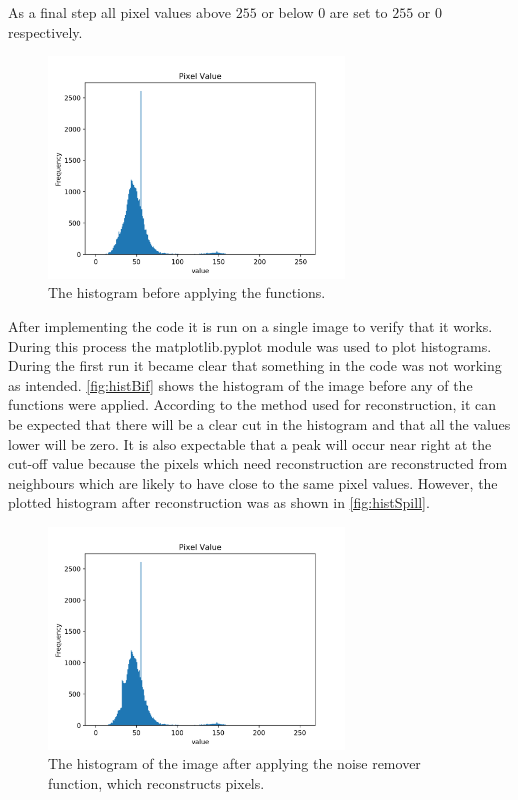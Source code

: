 As a final step all pixel values above $ 255 $ or below $ 0 $ are set to $ 255 $ or $ 0 $ respectively.

\begin{figure}[h]
\centering
\includegraphics[width=0.7\textwidth]{figures/hist_before.png}
\caption{The histogram before applying the functions.}
\label{fig:histBif}
\end{figure}

\noindent
After implementing the code it is run on a single image to verify that it works. During this process the matplotlib.pyplot module was used to plot histograms. During the first run it became clear that something in the code was not working as intended. \autoref{fig:histBif} shows the histogram of the image before any of the functions were applied. According to the method used for reconstruction, it can be expected that there will be a clear cut in the histogram and that all the values lower will be zero. It is also expectable that a peak will occur near right at the cut-off value because the pixels which need reconstruction are reconstructed from neighbours which are likely to have close to the same pixel values. However, the plotted histogram after reconstruction was as shown in \autoref{fig:histSpill}.

\begin{figure}[h]
\centering
\includegraphics[width=0.7\textwidth]{figures/hist_spill.png}
\caption{The histogram of the image after applying the noise remover function, which reconstructs pixels.}
\label{fig:histSpill}
\end{figure}


